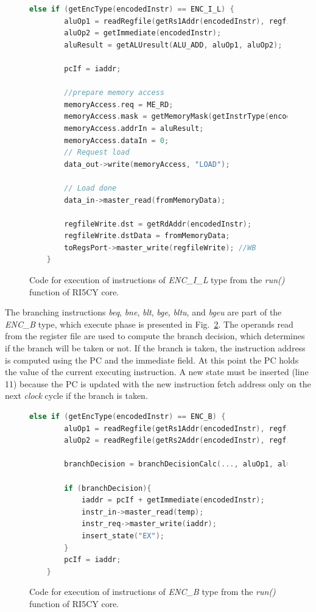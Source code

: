 \begin{figure}[htb!]
    \begin{lstlisting}[language=c++]
    else if (getEncType(encodedInstr) == ENC_I_L) {
        aluOp1 = readRegfile(getRs1Addr(encodedInstr), regfile);
        aluOp2 = getImmediate(encodedInstr);
        aluResult = getALUresult(ALU_ADD, aluOp1, aluOp2);
        
        pcIf = iaddr;
        
        //prepare memory access
        memoryAccess.req = ME_RD;
        memoryAccess.mask = getMemoryMask(getInstrType(encodedInstr));
        memoryAccess.addrIn = aluResult;
        memoryAccess.dataIn = 0;
        // Request load
        data_out->write(memoryAccess, "LOAD");
        
        // Load done
        data_in->master_read(fromMemoryData);
        
        regfileWrite.dst = getRdAddr(encodedInstr);
        regfileWrite.dstData = fromMemoryData;
        toRegsPort->master_write(regfileWrite); //WB
    }\end{lstlisting}
    \caption{Code for execution of instructions of \textit{ENC\_I\_L} type from the \textit{run()} function of RI5CY core.}
    \label{fig:ri5cy-enc-i-l}
\end{figure}

The branching instructions \textit{beq}, \textit{bne}, \textit{blt}, \textit{bge}, \textit{bltu}, and \textit{bgeu} are part of the \textit{ENC\_B} type, which execute phase is presented in Fig.~\ref{fig:ri5cy-enc-b}. The operands read from the register file are used to compute the branch decision, which determines if the branch will be taken or not. If the branch is taken, the instruction address is computed using the PC and the immediate field. At this point the PC holds the value of the current executing instruction. A new state must be inserted (line 11) because the PC is updated with the new instruction fetch address only on the next \textit{clock} cycle if the branch is taken.

\begin{figure}[htb!]
    \begin{lstlisting}[language=c++]
    else if (getEncType(encodedInstr) == ENC_B) {
        aluOp1 = readRegfile(getRs1Addr(encodedInstr), regfile);
        aluOp2 = readRegfile(getRs2Addr(encodedInstr), regfile);
        
        branchDecision = branchDecisionCalc(..., aluOp1, aluOp2);
        
        if (branchDecision){
            iaddr = pcIf + getImmediate(encodedInstr);
            instr_in->master_read(temp);
            instr_req->master_write(iaddr);
            insert_state("EX");
        }
        pcIf = iaddr;
    } \end{lstlisting}
    \caption{Code for execution of instructions of \textit{ENC\_B} type from the \textit{run()} function of RI5CY core.}
    \label{fig:ri5cy-enc-b}
\end{figure}

